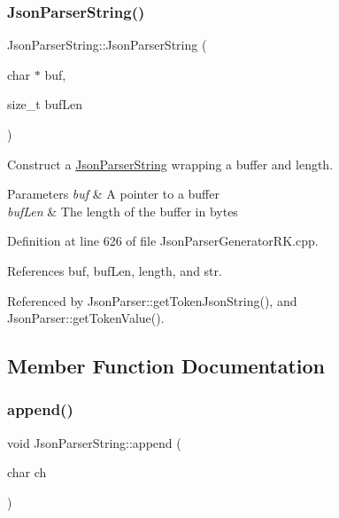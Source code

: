 \subsubsection{\texorpdfstring{Json\+Parser\+String()}{JsonParserString()}\hspace{0.1cm}{\footnotesize\ttfamily [2/2]}}
{\footnotesize\ttfamily Json\+Parser\+String\+::\+Json\+Parser\+String (\begin{DoxyParamCaption}\item[{char $\ast$}]{buf,  }\item[{size\+\_\+t}]{buf\+Len }\end{DoxyParamCaption})}



Construct a \hyperlink{class_json_parser_string}{Json\+Parser\+String} wrapping a buffer and length. 


\begin{DoxyParams}{Parameters}
{\em buf} & A pointer to a buffer\\
\hline
{\em buf\+Len} & The length of the buffer in bytes \\
\hline
\end{DoxyParams}


Definition at line 626 of file Json\+Parser\+Generator\+R\+K.\+cpp.



References buf, buf\+Len, length, and str.



Referenced by Json\+Parser\+::get\+Token\+Json\+String(), and Json\+Parser\+::get\+Token\+Value().



\subsection{Member Function Documentation}
\mbox{\label{class_json_parser_string_a7a8f809096c291c4cd7717df4a6534cf}} 
\subsubsection{\texorpdfstring{append()}{append()}\hspace{0.1cm}{\footnotesize\ttfamily [1/2]}}
{\footnotesize\ttfamily void Json\+Parser\+String\+::append (\begin{DoxyParamCaption}\item[{char}]{ch }\end{DoxyParamCaption})}



